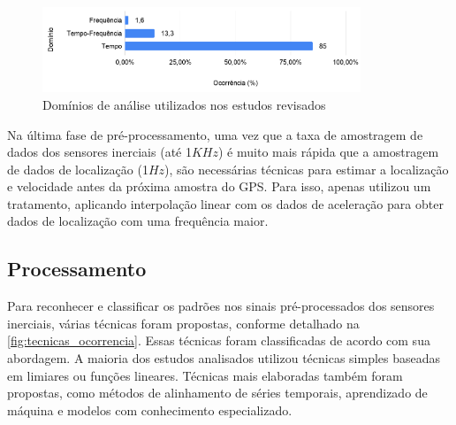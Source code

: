 \begin{figure}[h!]
  \centering
  \caption{Domínios de análise utilizados nos estudos revisados}
   \label{fig:dominios_analise_ocorrencia}
   \includegraphics[width=0.85\textwidth]{figuras/fig_18.png}
\end{figure}

Na última fase de pré-processamento, uma vez que a taxa de amostragem de dados dos sensores inerciais (até 1$KHz$) é muito mais rápida que a amostragem de dados de localização (1$Hz$), são necessárias técnicas para estimar a localização e velocidade antes da próxima amostra do GPS. Para isso, apenas  utilizou um tratamento, aplicando interpolação linear com os dados de aceleração para obter dados de localização com uma frequência maior. 

\subsection{Processamento}

Para reconhecer e classificar os padrões nos sinais pré-processados dos sensores inerciais, várias técnicas foram propostas, conforme detalhado na \autoref{fig:tecnicas_ocorrencia}. Essas técnicas foram classificadas de acordo com sua abordagem. A maioria dos estudos analisados utilizou técnicas simples baseadas em limiares ou funções lineares. Técnicas mais elaboradas também foram propostas, como métodos de alinhamento de séries temporais, aprendizado de máquina e modelos com conhecimento especializado.

